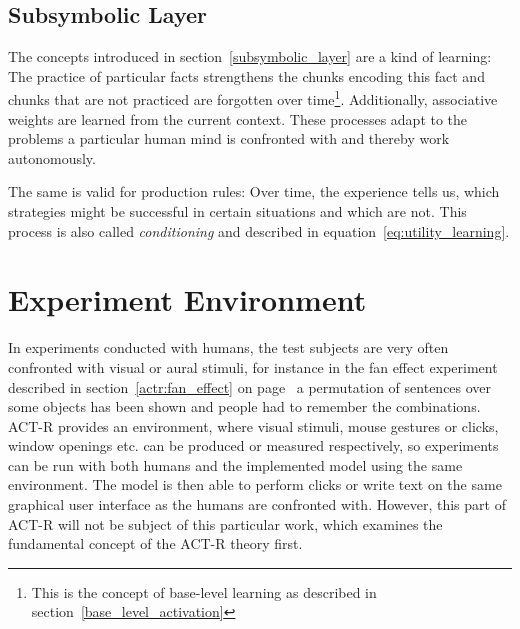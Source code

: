 \subsection{Subsymbolic Layer}

The concepts introduced in section~\ref{subsymbolic_layer} are a kind of learning: The practice of particular facts strengthens the chunks encoding this fact and chunks that are not practiced are forgotten over time\footnote{This is the concept of base-level learning as described in section~\ref{base_level_activation}}. Additionally, associative weights are learned from the current context. These processes adapt to the problems a particular human mind is confronted with and thereby work autonomously.

The same is valid for production rules: Over time, the experience tells us, which strategies might be successful in certain situations and which are not. This process is also called \emph{conditioning} and described in equation~\eqref{eq:utility_learning}.

\section{Experiment Environment}
\label{experiment_environment}

In experiments conducted with humans, the test subjects are very often confronted with visual or aural stimuli, for instance in the fan effect experiment described in section~\ref{actr:fan_effect} on page~\pageref{actr:fan_effect} a permutation of sentences over some objects has been shown and people had to remember the combinations. ACT-R provides an environment, where visual stimuli, mouse gestures or clicks, window openings etc. can be produced or measured respectively, so experiments can be run with both humans and the implemented model using the same environment. The model is then able to perform clicks or write text on the same graphical user interface as the humans are confronted with. However, this part of ACT-R will not be subject of this particular work, which examines the fundamental concept of the ACT-R theory first.
